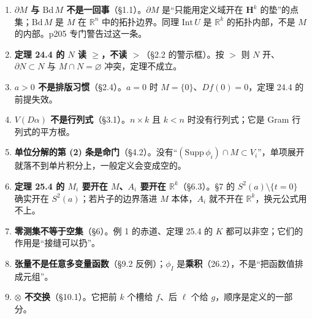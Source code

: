 \documentclass[11pt]{ctexart}
\newcommand{\HH}{\mathbf{H}}
\newcommand{\Vvol}{V}
\begin{document}

\begin{enumerate}
  \item \textbf{$\partial M$ 与 $\mathrm{Bd}\,M$ 不是一回事}（§1.1）。$\partial M$ 是“只能用定义域开在 $\HH^k$ 的垫”的点集；$\mathrm{Bd}\,M$ 是 $M$ 在 $\mathbb{R}^n$ 中的拓扑边界。同理 $\mathrm{Int}\,U$ 是 $\mathbb{R}^k$ 的拓扑内部，不是 $M$ 的内部。p205 专门警告过这一条。
  \item \textbf{定理 24.4 的 $N$ 读 $\ge$，不读 $>$}（§2.2 的警示框）。按 $>$ 则 $N$ 开、$\partial N\subset N$ 与 $M\cap N=\varnothing$ 冲突，定理不成立。
  \item \textbf{$a>0$ 不是排版习惯}（§2.4）。$a=0$ 时 $M=\{0\}$、$Df(0)=0$，定理 24.4 的前提失效。
  \item \textbf{$\Vvol(D\alpha)$ 不是行列式}（§3.1）。$n\times k$ 且 $k<n$ 时没有行列式；它是 Gram 行列式的平方根。
  \item \textbf{单位分解的第 (2) 条是命门}（§4.2）。没有“$(\mathrm{Supp}\,\phi_i)\cap M\subset V_i$”，单项展开就落不到单片积分上，一般定义会变成空的。
  \item \textbf{定理 25.4 的 $M_i$ 要开在 $M$、$A_i$ 要开在 $\mathbb{R}^k$}（§6.3）。§7 的 $S^2(a)\setminus\{t=0\}$ 确实开在 $S^2(a)$；若片子的边界落进 $M$ 本体，$A_i$ 就不开在 $\mathbb{R}^k$，换元公式用不上。
  \item \textbf{零测集不等于空集}（§6）。例 1 的赤道、定理 25.4 的 $K$ 都可以非空；它们的作用是“接缝可以扔”。
  \item \textbf{张量不是任意多变量函数}（§9.2 反例）；$\phi_I$ 是\textbf{乘积}（26.2），不是“把函数值排成元组”。
  \item \textbf{$\otimes$ 不交换}（§10.1）。它把前 $k$ 个槽给 $f$、后 $\ell$ 个给 $g$，顺序是定义的一部分。
\end{enumerate}




\end{document}
